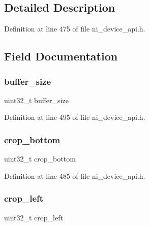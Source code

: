 \subsection{Detailed Description}


Definition at line 475 of file ni\+\_\+device\+\_\+api.\+h.



\subsection{Field Documentation}
\mbox{\label{struct__ni__frame_ab4bab919e0d995ad7249474cd9028105}} 
\subsubsection{\texorpdfstring{buffer\_size}{buffer\_size}}
{\footnotesize\ttfamily uint32\+\_\+t buffer\+\_\+size}



Definition at line 495 of file ni\+\_\+device\+\_\+api.\+h.

\mbox{\label{struct__ni__frame_a94c03dfca2d0c8f67ef1b4fec9190b97}} 
\subsubsection{\texorpdfstring{crop\_bottom}{crop\_bottom}}
{\footnotesize\ttfamily uint32\+\_\+t crop\+\_\+bottom}



Definition at line 485 of file ni\+\_\+device\+\_\+api.\+h.

\mbox{\label{struct__ni__frame_ac104de359eae4cad0858caac68e4dae1}} 
\subsubsection{\texorpdfstring{crop\_left}{crop\_left}}
{\footnotesize\ttfamily uint32\+\_\+t crop\+\_\+left}



